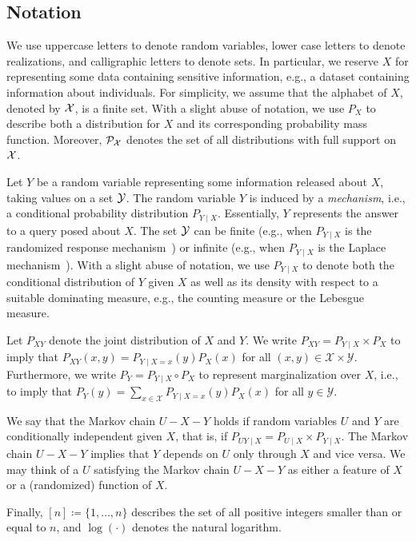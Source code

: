 \subsection{Notation}
We use uppercase letters to denote random variables, lower case letters to denote realizations, and calligraphic letters to denote sets. In particular, we reserve $X$ for representing some data containing sensitive information, e.g., a dataset containing information about individuals. For simplicity, we assume that the alphabet of $X$, denoted by $\mathcal{X}$, is a finite set. With a slight abuse of notation, we use $P_X$ to describe both a distribution for $X$ and its corresponding probability mass function. Moreover, $\mathcal{P}_{\mathcal{X}}$ denotes the set of all distributions with full support on $\mathcal{X}$. 

Let $Y$ be a random variable representing some information released about $X$, taking values on a set $\mathcal{Y}$. The random variable $Y$ is induced by a \emph{mechanism}, i.e., a conditional probability distribution $P_{Y \mid X}$. Essentially, $Y$ represents the answer to a query posed about $X$. The set $\mathcal{Y}$ can be finite (e.g., when $P_{Y \mid X}$ is the randomized response mechanism~\cite{warner1965randomized}) or infinite (e.g., when $P_{Y \mid X}$ is the Laplace mechanism~\cite{dworkCalibratingNoiseSensitivity}). With a slight abuse of notation, we use $P_{Y \mid X}$ to denote both the conditional distribution of $Y$ given $X$ as well as its density with respect to a suitable dominating measure, e.g., the counting measure or the Lebesgue measure.  

Let $P_{XY}$ denote the joint distribution of $X$ and $Y$. We write $P_{XY} = P_{Y \mid X} \times P_X$ to imply that $P_{XY}(x,y) = P_{Y \mid X =x}(y) P_X(x)$ for all $(x,y) \in \mathcal X \times \mathcal Y$. Furthermore, we write $P_{Y} = P_{Y \mid X} \circ P_X$ to represent marginalization over $X$, i.e., to imply that ${P}_{Y}(y) = \sum_{x \in \mathcal X}  P_{Y \mid X=x}(y)  P_X(x)$ for all $y \in \mathcal Y$. 

We say that the Markov chain $U - X - Y$ holds if random variables $U$ and $Y$ are conditionally independent given $X$, that is, if $P_{UY \mid X} = P_{U \mid X} \times P_{Y \mid X}$. The Markov chain $U - X - Y$ implies that  $Y$ depends on $U$ only through $X$ and vice versa. We may think of a $U$ satisfying the Markov chain $U-X-Y$ as either a feature of $X$ or a (randomized) function of $X$. 

Finally, $[n] \coloneqq \{1, \ldots, n\}$ describes the set of all positive integers smaller than or equal to $n$, and $\log(\cdot)$ denotes the natural logarithm.

